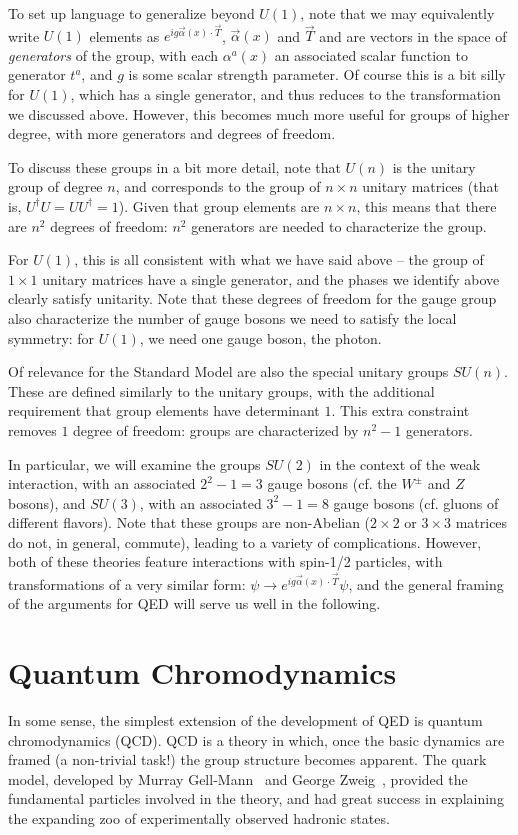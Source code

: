 To set up language to generalize beyond $U(1)$, note that we may equivalently write $U(1)$ elements as
$e^{ig\vec{\alpha}(x)\cdot \vec{T}}$, $\vec{\alpha}(x)$ and $\vec{T}$ and are vectors in the space of 
\emph{generators} of the group, with each $\alpha^{a}(x)$ an associated scalar function to generator $t^{a}$, 
and $g$ is some scalar strength parameter. Of course this is a bit silly for $U(1)$, which has a single generator, 
and thus reduces to the transformation we discussed above. However, this becomes much more useful for groups of higher 
degree, with more generators and degrees of freedom.

To discuss these groups in a bit more detail, note that $U(n)$ is the unitary group of 
degree $n$, and corresponds to the group of $n \times n$ unitary matrices (that is, $U^{\dagger}U = UU^{\dagger} = 1$).
Given that group elements are $n\times n$, this means that there are $n^2$ degrees of freedom:
$n^2$ generators are needed to characterize the group.

For $U(1)$, this is all consistent with what we have said above -- the group of $1 \times 1$ unitary matrices 
have a single generator, and the phases we identify above clearly satisfy unitarity. Note that these degrees 
of freedom for the gauge group also characterize the number of gauge bosons we need to satisfy the local symmetry: 
for $U(1)$, we need one gauge boson, the photon.

Of relevance for the Standard Model are also the special unitary groups $SU(n)$. These are defined similarly 
to the unitary groups, with the additional requirement that group elements have determinant $1$. This extra 
constraint removes $1$ degree of freedom: groups are characterized by $n^2-1$ generators.

In particular, we will examine the groups $SU(2)$ in the context of the weak interaction, with an associated
$2^2-1=3$ gauge bosons (cf. the $W^{\pm}$ and $Z$ bosons), and $SU(3)$, with an associated $3^2-1 = 8$ gauge bosons 
(cf. gluons of different flavors). Note that these groups are non-Abelian ($2\times 2$ or $3\times 3$ matrices do not, 
in general, commute), leading to a variety of complications. However, both of these theories feature interactions with 
spin-1/2 particles, with transformations of a very similar form: $\psi \rightarrow e^{ig\vec{\alpha}(x)\cdot \vec{T}}\psi$, 
and the general framing of the arguments for QED will serve us well in the following.


\section{Quantum Chromodynamics}
In some sense, the simplest extension of the development of QED is quantum chromodynamics (QCD). QCD is a 
theory in which, once the basic dynamics are framed (a non-trivial task!) the group structure becomes 
apparent. The quark model, developed by Murray Gell-Mann~\cite{Gell-Mann} and George Zweig~\cite{Zweig}, provided the 
fundamental particles involved in the theory, and had great success in explaining the expanding zoo 
of experimentally observed hadronic states.

